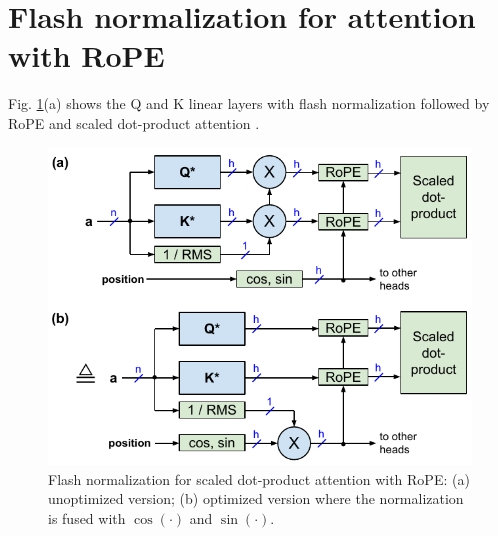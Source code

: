 \documentclass{article}
\numberwithin{equation}{section} %
\def\cosi{\cos{(\cdot)}}              %
\def\sini{\sin{(\cdot)}}              %
\begin{document}
\section{Flash normalization for attention with RoPE}
Fig. \ref{fig5}(a) shows the Q and K linear layers with flash normalization followed by RoPE \citep{RoPE} and scaled dot-product attention \citep{vanilla}.
\begin{figure}[h!] \centering
  \includegraphics[scale=0.9]{../doc/fig/flashNorm_fig5.pdf}
  \caption{Flash normalization for scaled dot-product attention with RoPE: (a) unoptimized version; (b) optimized version where the normalization is fused with $\cosi$ and $\sini$.}
\label{fig5} \end{figure}
\end{document}
